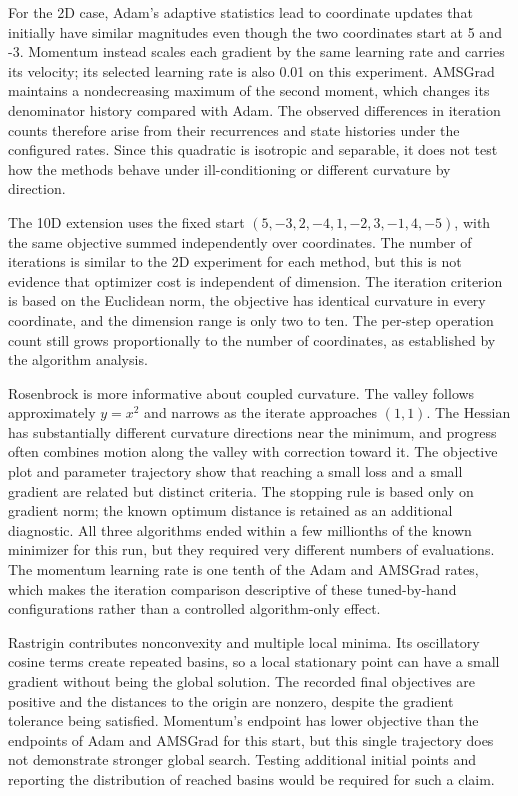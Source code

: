 \documentclass[conference]{IEEEtran}
\begin{document}
For the 2D case, Adam's adaptive statistics lead to coordinate updates that initially have similar magnitudes even though the two coordinates start at 5 and -3. Momentum instead scales each gradient by the same learning rate and carries its velocity; its selected learning rate is also 0.01 on this experiment. AMSGrad maintains a nondecreasing maximum of the second moment, which changes its denominator history compared with Adam. The observed differences in iteration counts therefore arise from their recurrences and state histories under the configured rates. Since this quadratic is isotropic and separable, it does not test how the methods behave under ill-conditioning or different curvature by direction.

The 10D extension uses the fixed start $(5,-3,2,-4,1,-2,3,-1,4,-5)$, with the same objective summed independently over coordinates. The number of iterations is similar to the 2D experiment for each method, but this is not evidence that optimizer cost is independent of dimension. The iteration criterion is based on the Euclidean norm, the objective has identical curvature in every coordinate, and the dimension range is only two to ten. The per-step operation count still grows proportionally to the number of coordinates, as established by the algorithm analysis.

Rosenbrock is more informative about coupled curvature. The valley follows approximately $y=x^2$ and narrows as the iterate approaches $(1,1)$. The Hessian has substantially different curvature directions near the minimum, and progress often combines motion along the valley with correction toward it. The objective plot and parameter trajectory show that reaching a small loss and a small gradient are related but distinct criteria. The stopping rule is based only on gradient norm; the known optimum distance is retained as an additional diagnostic. All three algorithms ended within a few millionths of the known minimizer for this run, but they required very different numbers of evaluations. The momentum learning rate is one tenth of the Adam and AMSGrad rates, which makes the iteration comparison descriptive of these tuned-by-hand configurations rather than a controlled algorithm-only effect.

Rastrigin contributes nonconvexity and multiple local minima. Its oscillatory cosine terms create repeated basins, so a local stationary point can have a small gradient without being the global solution. The recorded final objectives are positive and the distances to the origin are nonzero, despite the gradient tolerance being satisfied. Momentum's endpoint has lower objective than the endpoints of Adam and AMSGrad for this start, but this single trajectory does not demonstrate stronger global search. Testing additional initial points and reporting the distribution of reached basins would be required for such a claim.
\end{document}
